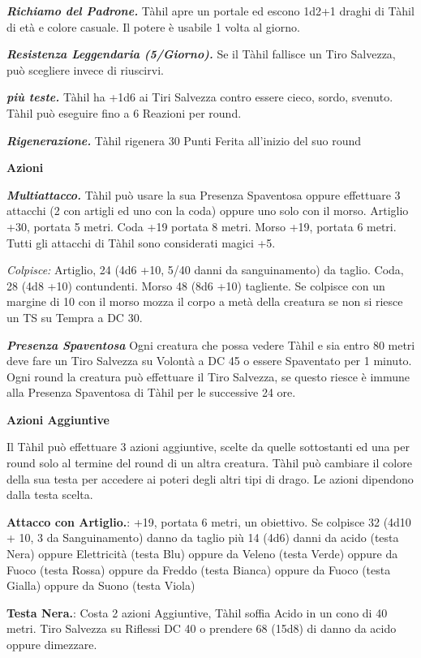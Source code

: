 \begin{multicols}{2}
{\emph{\textbf{Richiamo del Padrone.}} Tàhil apre un portale ed escono 1d2+1 draghi di Tàhil di età e colore casuale. Il potere è usabile 1 volta al giorno.

\emph{\textbf{Resistenza Leggendaria (5/Giorno).}} Se il Tàhil fallisce un Tiro Salvezza, può scegliere invece di riuscirvi.

\emph{\textbf{più teste.}} Tàhil ha +1d6 ai Tiri Salvezza contro essere cieco, sordo, svenuto. Tàhil può eseguire fino a 6 Reazioni per round.

\emph{\textbf{Rigenerazione.}} Tàhil rigenera 30 Punti Ferita all'inizio del suo round

\textbf{Azioni}

\emph{\textbf{Multiattacco.}} Tàhil può usare la sua Presenza Spaventosa oppure effettuare 3 attacchi (2 con artigli ed uno con la coda) oppure uno solo con il morso. Artiglio +30, portata 5 metri. Coda +19 portata 8 metri. Morso +19, portata 6 metri. Tutti gli attacchi di Tàhil sono considerati magici +5.

\emph{Colpisce:} Artiglio, 24 (4d6 +10, 5/40 danni da sanguinamento) da taglio. Coda, 28 (4d8 +10) contundenti. Morso 48 (8d6 +10) tagliente. Se colpisce con un margine di 10 con il morso mozza il corpo a metà della creatura se non si riesce un TS su Tempra a DC 30.

\emph{\textbf{Presenza Spaventosa}} Ogni creatura che possa vedere Tàhil e sia entro 80 metri deve fare un Tiro Salvezza su Volontà a DC 45 o essere Spaventato per 1 minuto. Ogni round la creatura può effettuare il Tiro Salvezza, se questo riesce è immune alla Presenza Spaventosa di Tàhil per le successive 24 ore.

\textbf{Azioni Aggiuntive}

Il Tàhil può effettuare 3 azioni aggiuntive, scelte da quelle sottostanti ed una per round solo al termine del round di un altra creatura. Tàhil può cambiare il colore della sua testa per accedere ai poteri degli altri tipi di drago. Le azioni dipendono dalla testa scelta.

\textbf{Attacco con Artiglio.}: +19, portata 6 metri, un obiettivo. Se colpisce 32 (4d10 + 10, 3 da Sanguinamento) danno da taglio più 14 (4d6) danni da acido (testa Nera) oppure Elettricità (testa Blu) oppure da Veleno (testa Verde) oppure da Fuoco (testa Rossa) oppure da Freddo (testa Bianca) oppure da Fuoco (testa Gialla) oppure da Suono (testa Viola)

\textbf{Testa Nera.}: Costa 2 azioni Aggiuntive, Tàhil soffia Acido in un cono di 40 metri. Tiro Salvezza su Riflessi DC 40 o prendere 68 (15d8) di danno da acido oppure dimezzare.

}
\end{multicols}
